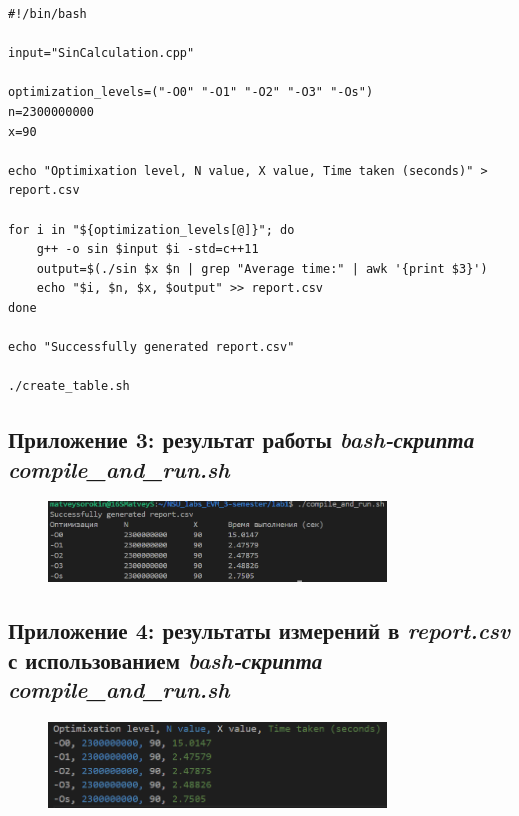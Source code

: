 \documentclass[12pt,a4paper]{article}
\numberwithin{subsection}{section}
\begin{document}
\begin{lstlisting}
#!/bin/bash

input="SinCalculation.cpp"

optimization_levels=("-O0" "-O1" "-O2" "-O3" "-Os")
n=2300000000
x=90

echo "Optimixation level, N value, X value, Time taken (seconds)" > report.csv

for i in "${optimization_levels[@]}"; do
    g++ -o sin $input $i -std=c++11
    output=$(./sin $x $n | grep "Average time:" | awk '{print $3}')
    echo "$i, $n, $x, $output" >> report.csv
done

echo "Successfully generated report.csv"

./create_table.sh    
\end{lstlisting}

\newpage


\subsection*{Приложение 3: результат работы \textit{bash-скрипта}
\textit{compile\_and\_run.sh}}

\begin{figure}[H]
    \includegraphics[width=0.8\textwidth]{3.png}
\end{figure}

\vspace{1cm}


\subsection*{Приложение 4: результаты измерений в \textit{report.csv} с использованием 
\textit{bash-скрипта} \textit{compile\_and\_run.sh}}

\begin{figure}[H]
    \includegraphics[width=0.8\textwidth]{4.png}
\end{figure}
\end{document}
